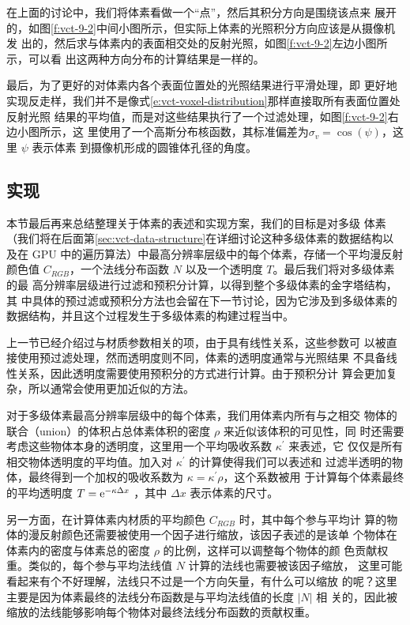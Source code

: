 在上面的讨论中，我们将体素看做一个“点”，然后其积分方向是围绕该点来 展开的，如图\ref{f:vct-9-2}中间小图所示，但实际上体素的光照积分方向应该是从摄像机发 出的，然后求与体素内的表面相交处的反射光照，如图\ref{f:vct-9-2}左边小图所示，可以看 出这两种方向分布的计算结果是一样的。

最后，为了更好的对体素内各个表面位置处的光照结果进行平滑处理，即 更好地实现反走样，我们并不是像式\ref{e:vct-voxel-distribution}那样直接取所有表面位置处反射光照 结果的平均值，而是对这些结果执行了一个过滤处理，如图\ref{f:vct-9-2}右边小图所示，这 里使用了一个高斯分布核函数，其标准偏差为$\sigma_v= \cos(\psi)$，这里 $\psi$ 表示体素 到摄像机形成的圆锥体孔径的角度。




\subsection{实现}\label{sec:vct-implementation}
本节最后再来总结整理关于体素的表述和实现方案，我们的目标是对多级 体素（我们将在后面第\ref{sec:vct-data-structure}在详细讨论这种多级体素的数据结构以及在 GPU 中的遍历算法）中最高分辨率层级中的每个体素，存储一个平均漫反射颜色值 $C_{RGB}$，一个法线分布函数 $N$ 以及一个透明度 $T$。最后我们将对多级体素的最 高分辨率层级进行过滤和预积分计算，以得到整个多级体素的金字塔结构，其 中具体的预过滤或预积分方法也会留在下一节讨论，因为它涉及到多级体素的 数据结构，并且这个过程发生于多级体素的构建过程当中。

上一节已经介绍过与材质参数相关的项，由于具有线性关系，这些参数可 以被直接使用预过滤处理，然而透明度则不同，体素的透明度通常与光照结果 不具备线性关系，因此透明度需要使用预积分的方式进行计算。由于预积分计 算会更加复杂，所以通常会使用更加近似的方法。

对于多级体素最高分辨率层级中的每个体素，我们用体素内所有与之相交 物体的联合（union）的体积占总体素体积的密度 $\rho$ 来近似该体积的可见性，同 时还需要考虑这些物体本身的透明度，这里用一个平均吸收系数 $\kappa^{'}$  来表述，它 仅仅是所有相交物体透明度的平均值。加入对 $\kappa^{'}$ 的计算使得我们可以表述和 过滤半透明的物体，最终得到一个加权的吸收系数为 $\kappa =\kappa^{'} \rho$，这个系数被用 于计算每个体素最终的平均透明度 $T = {\rm e}^{-\kappa\Delta x}$ ，其中 $\Delta x$ 表示体素的尺寸。

另一方面，在计算体素内材质的平均颜色 $C_{RGB}$ 时，其中每个参与平均计 算的物体的漫反射颜色还需要被使用一个因子进行缩放，该因子表述的是该单 个物体在体素内的密度与体素总的密度 $\rho$ 的比例，这样可以调整每个物体的颜 色贡献权重。类似的，每个参与平均法线值 $N$ 计算的法线也需要被该因子缩放， 这里可能看起来有个不好理解，法线只不过是一个方向矢量，有什么可以缩放 的呢？这里主要是因为体素最终的法线分布函数是与平均法线值的长度 $|N|$ 相 关的，因此被缩放的法线能够影响每个物体对最终法线分布函数的贡献权重。

